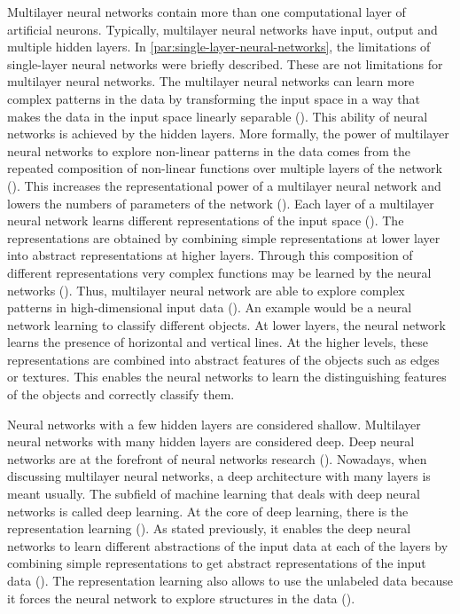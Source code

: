 \documentclass{BachelorBUI}
\begin{document}
                Multilayer neural networks contain more than one computational layer of artificial neurons. Typically, multilayer neural networks have input, output and multiple hidden layers. In \autoref{par:single-layer-neural-networks}, the limitations of single-layer neural networks were briefly described. These are not limitations for multilayer neural networks. The multilayer neural networks can learn more complex patterns in the data by transforming the input space in a way that makes the data in the input space linearly separable (\cite{LeCun:2015}). This ability of neural networks is achieved by the hidden layers. More formally, the power of multilayer neural networks to explore non-linear patterns in the data comes from the repeated composition of non-linear functions over multiple layers of the network (\cite{Aggarwal:2018}). This increases the representational power of a multilayer neural network and lowers the numbers of parameters of the network (\cite{Aggarwal:2018}). Each layer of a multilayer neural network learns different representations of the input space (\cite{LeCun:2015}). The representations are obtained by combining simple representations at lower layer into abstract representations at higher layers. Through this composition of different representations very complex functions may be learned by the neural networks (\cite{Bishop:2024}). Thus, multilayer neural network are able to explore complex patterns in high-dimensional input data (\cite{LeCun:2015}). An example would be a neural network learning to classify different objects. At lower layers, the neural network learns the presence of horizontal and vertical lines. At the higher levels, these representations are combined into abstract features of the objects such as edges or textures. This enables the neural networks to learn the distinguishing features of the objects and correctly classify them.

                Neural networks with a few hidden layers are considered shallow. Multilayer neural networks with many hidden layers are considered deep. Deep neural networks are at the forefront of neural networks research (\cite{LeCun:2015}). Nowadays, when discussing multilayer neural networks, a deep architecture with many layers is meant usually. The subfield of machine learning that deals with deep neural networks is called deep learning. At the core of deep learning, there is the representation learning (\cite{LeCun:2015}). As stated previously, it enables the deep neural networks to learn different abstractions of the input data at each of the layers by combining simple representations to get abstract representations of the input data (\cite{LeCun:2015}). The representation learning also allows to use the unlabeled data because it forces the neural network to explore structures in the data (\cite{Bishop:2024}).
\end{document}
